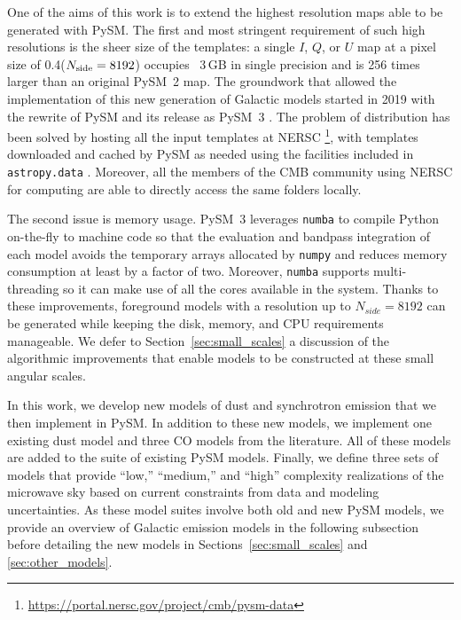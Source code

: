 \documentclass[twocolumn]{aastex631}
\begin{document}
One of the aims of this work is to extend the highest resolution maps able to be generated with PySM. The first and most stringent requirement of such high resolutions is the sheer size of the templates: a single $I$, $Q$, or $U$ map at a pixel size of 0.4\arcmin ($N_{\rm side}=8192$) occupies ~3\,GB in single precision and is 256 times larger than an original PySM~2 map. The groundwork that allowed the implementation of this new generation of Galactic models started in 2019 with the rewrite of PySM and its release as PySM~3 \citep[see][for details]{Zonca:2021}. The problem of distribution has been solved by hosting all the input templates at NERSC \footnote{\url{https://portal.nersc.gov/project/cmb/pysm-data}}, with templates downloaded and cached by PySM as needed using the facilities included in \texttt{astropy.data} \citep{AstropyCollaboration:2013, AstropyCollaboration:2018}. Moreover, all the members of the CMB community using NERSC for computing are able to directly access the same folders locally.

The second issue is memory usage. PySM~3 leverages \texttt{numba} \citep{Lam:2015} to compile Python on-the-fly to machine code so that the evaluation and bandpass integration of each model avoids the temporary arrays allocated by \texttt{numpy} and reduces memory consumption at least by a factor of two. Moreover, \texttt{numba} supports multi-threading so it can make use of all the cores available in the system. Thanks to these improvements, foreground models with a resolution up to $N_{side}=8192$ can be generated while keeping the disk, memory, and CPU requirements manageable. We defer to Section~\ref{sec:small_scales} a discussion of the algorithmic improvements that enable models to be constructed at these small angular scales.

In this work, we develop new models of dust and synchrotron emission that we then implement in PySM. In addition to these new models, we implement one existing dust model and three CO models from the literature. All of these models are added to the suite of existing PySM models. Finally, we define three sets of models that provide ``low,'' ``medium,'' and ``high'' complexity realizations of the microwave sky based on current constraints from data and modeling uncertainties. As these model suites involve both old and new PySM models, we provide an overview of Galactic emission models in the following subsection before detailing the new models in Sections~\ref{sec:small_scales} and \ref{sec:other_models}.
\end{document}

